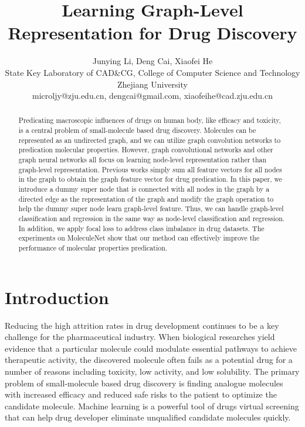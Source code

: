 \documentclass[letterpaper]{article} \usepackage{aaai18}  \usepackage{times}  \usepackage{helvet}  \usepackage{courier}  \usepackage{url}  \usepackage{graphicx}  \usepackage{amsmath}
\begin{document}
 
\title{Learning Graph-Level Representation for Drug Discovery}

\author{Junying Li, Deng Cai, Xiaofei He\\
State Key Laboratory of CAD\&CG, College of Computer Science and Technology \\
Zhejiang University\\
microljy@zju.edu.cn, dengcai@gmail.com, xiaofeihe@cad.zju.edu.cn\\
}

\maketitle
\begin{abstract}
Predicating macroscopic influences of drugs on human body, like efficacy and toxicity, is a central problem of small-molecule based drug discovery. Molecules can be represented as an undirected graph, and we can utilize graph convolution networks to predication molecular properties. However, graph convolutional networks and other graph neural networks all focus on learning node-level representation rather than graph-level representation. Previous works simply sum all feature vectors for all nodes in the graph to obtain the graph feature vector for drug predication. In this paper, we introduce a dummy super node that is connected with all nodes in the graph by a directed edge as the representation of the graph and modify the graph operation to help the dummy super node learn graph-level feature. Thus, we can handle graph-level classification and regression in the same way as node-level classification and regression. In addition, we apply focal loss to address class imbalance in drug datasets. The experiments on MoleculeNet show that our method can effectively improve the performance of molecular properties predication.
 
\end{abstract}
\section{Introduction}

\noindent Reducing the high attrition rates in drug development continues to be a key challenge for the pharmaceutical industry. When biological researches yield evidence that a particular molecule could modulate essential pathways to achieve therapeutic activity, the discovered molecule often fails as a potential drug for a number of reasons including toxicity, low activity, and low solubility\cite{waring2015analysis}. The primary problem of small-molecule based drug discovery is finding analogue molecules with increased efficacy and reduced safe risks to the patient to optimize the candidate molecule. Machine learning is a powerful tool of drugs virtual screening that can help drug developer eliminate unqualified candidate molecules quickly.
\end{document}
